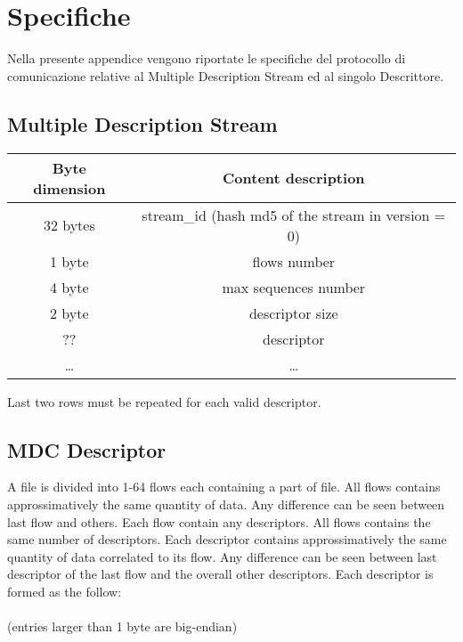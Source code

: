 \chapter{Specifiche}
Nella presente appendice vengono riportate le specifiche del protocollo di
comunicazione relative al Multiple Description Stream ed al singolo Descrittore.

\section{Multiple Description Stream}
\begin{center} \begin{tabular}{|c|c|}
\hline
Byte dimension & Content description\\
\hline \hline
32 bytes & stream\_id (hash md5 of the stream in version = 0)\\
1 byte & flows number\\
4 byte & max sequences number\\
2 byte &descriptor size\\
?? & descriptor\\
\ldots & \ldots\\
\hline
\end{tabular} \end{center}
Last two rows must be repeated for each valid descriptor.

\section{MDC Descriptor}
A file is divided into 1-64 flows each containing a part of file. All flows contains
approssimatively the same quantity of data. Any difference can be seen between last flow and
others. Each flow contain any descriptors. All flows contains the same number of descriptors.
Each descriptor contains approssimatively the same quantity of data correlated to its flow.
Any difference can be seen between last descriptor of the last flow and the overall other
descriptors. Each descriptor is formed as the follow:\\
\\
(entries larger than 1 byte are big-endian)\\

